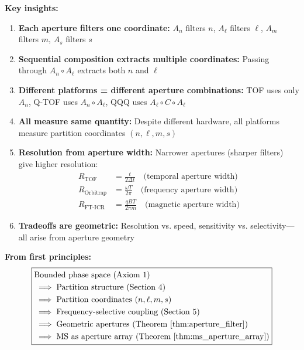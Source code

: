 \textbf{Key insights:}

\begin{enumerate}
    \item \textbf{Each aperture filters one coordinate:} $A_n$ filters $n$, $A_\ell$ filters $\ell$, $A_m$ filters $m$, $A_s$ filters $s$

    \item \textbf{Sequential composition extracts multiple coordinates:} Passing through $A_n \circ A_\ell$ extracts both $n$ and $\ell$

    \item \textbf{Different platforms = different aperture combinations:} TOF uses only $A_n$, Q-TOF uses $A_n \circ A_\ell$, QQQ uses $A_\ell \circ C \circ A_\ell$

    \item \textbf{All measure same quantity:} Despite different hardware, all platforms measure partition coordinates $(n,\ell,m,s)$

    \item \textbf{Resolution from aperture width:} Narrower apertures (sharper filters) give higher resolution:
    \begin{align}
    R_{\text{TOF}} &= \frac{t}{2\Delta t} \quad \text{(temporal aperture width)} \\
    R_{\text{Orbitrap}} &= \frac{\omega T}{2\pi} \quad \text{(frequency aperture width)} \\
    R_{\text{FT-ICR}} &= \frac{qBT}{2\pi m} \quad \text{(magnetic aperture width)}
    \end{align}

    \item \textbf{Tradeoffs are geometric:} Resolution vs. speed, sensitivity vs. selectivity—all arise from aperture geometry
\end{enumerate}

\textbf{From first principles:}
\begin{equation}
\boxed{
\begin{aligned}
&\text{Bounded phase space (Axiom 1)} \\
&\implies \text{Partition structure (Section 4)} \\
&\implies \text{Partition coordinates } (n,\ell,m,s) \\
&\implies \text{Frequency-selective coupling (Section 5)} \\
&\implies \text{Geometric apertures (Theorem \ref{thm:aperture_filter})} \\
&\implies \text{MS as aperture array (Theorem \ref{thm:ms_aperture_array})}
\end{aligned}
}
\end{equation}

